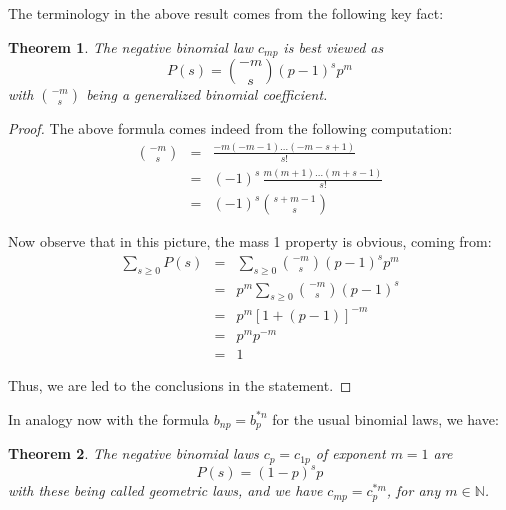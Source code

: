 \documentclass[12pt]{amsbook}
\newtheorem{theorem}{Theorem}[chapter]
\begin{document}
The terminology in the above result comes from the following key fact:


\begin{theorem}
The negative binomial law $c_{mp}$ is best viewed as
$$P(s)=\binom{-m}{s}(p-1)^sp^m$$
with $\binom{-m}{s}$ being a generalized binomial coefficient.
\end{theorem}

\begin{proof}
The above formula comes indeed from the following computation:
\begin{eqnarray*}
\binom{-m}{s}
&=&\frac{-m(-m-1)\ldots(-m-s+1)}{s!}\\
&=&(-1)^s\,\frac{m(m+1)\ldots(m+s-1)}{s!}\\
&=&(-1)^s\binom{s+m-1}{s}
\end{eqnarray*}

Now observe that in this picture, the mass 1 property is obvious, coming from:
\begin{eqnarray*}
\sum_{s\geq0}P(s)
&=&\sum_{s\geq0}\binom{-m}{s}(p-1)^sp^m\\
&=&p^m\sum_{s\geq0}\binom{-m}{s}(p-1)^s\\
&=&p^m[1+(p-1)]^{-m}\\
&=&p^mp^{-m}\\
&=&1
\end{eqnarray*}

Thus, we are led to the conclusions in the statement.
\end{proof}

In analogy now with the formula $b_{np}=b_p^{*n}$ for the usual binomial laws, we have:

\begin{theorem}
The negative binomial laws $c_p=c_{1p}$ of exponent $m=1$ are
$$P(s)=(1-p)^sp$$
with these being called geometric laws, and we have $c_{mp}=c_p^{*m}$, for any $m\in\mathbb N$.
\end{theorem}
\end{document}
